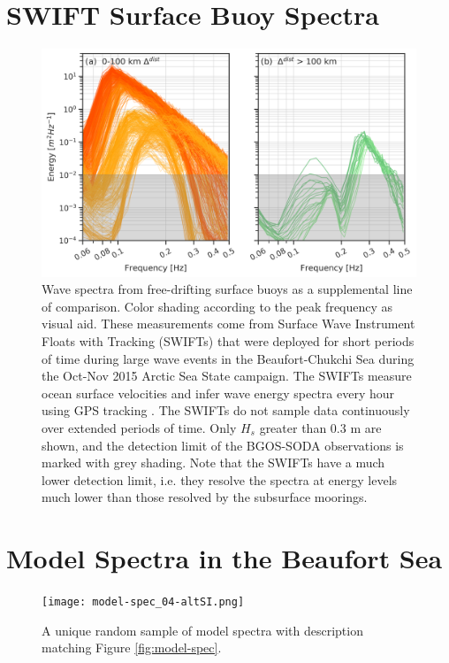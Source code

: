 \documentclass [11pt, proquest] {uwthesis}[2020/02/24]
\begin{document}
\section{SWIFT Surface Buoy Spectra}
\begin{figure}[H]
    \noindent\includegraphics[width=1.0\textwidth]{swift_01.png}
    \caption{Wave spectra from free-drifting surface buoys as a supplemental line of comparison. Color shading according to the peak frequency as visual aid. These measurements come from Surface Wave Instrument Floats with Tracking (SWIFTs) \cite{Thomson2012WaveDrifters} that were deployed for short periods of time during large wave events in the Beaufort-Chukchi Sea during the Oct-Nov 2015 Arctic Sea State campaign. The SWIFTs measure ocean surface velocities and infer wave energy spectra every hour using GPS tracking \cite{Herbers2012ObservingBuoys}. The SWIFTs do not sample data continuously over extended periods of time. Only $H_s$ greater than 0.3 m are shown, and the detection limit of the BGOS-SODA observations is marked with grey shading. Note that the SWIFTs have a much lower detection limit, i.e. they resolve the spectra at energy levels much lower than those resolved by the subsurface moorings.}
    \label{SI:swift}
\end{figure}

\section{Model Spectra in the Beaufort Sea}
\begin{figure}[H]
    \noindent\texttt{[image: model-spec\_04-altSI.png]}
    \caption{A unique random sample of model spectra with description matching Figure \ref{fig:model-spec}.}
    \label{SI:model-spec-alt}
\end{figure}
\end{document}
